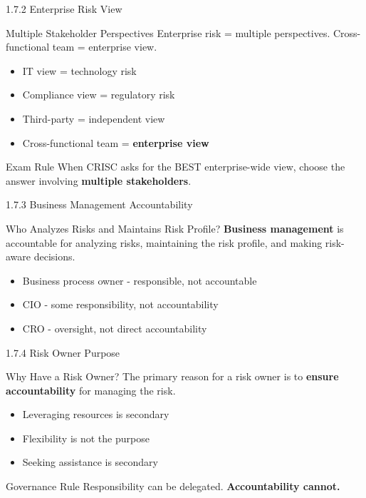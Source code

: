 \documentclass{beamer}
\begin{document}
	\begin{frame}{1.7.2 Enterprise Risk View}
		\begin{block}{Multiple Stakeholder Perspectives}
			Enterprise risk = multiple perspectives. Cross-functional team = enterprise view.
		\end{block}
		\begin{itemize}
			\item IT view = technology risk
			\item Compliance view = regulatory risk
			\item Third-party = independent view
			\item Cross-functional team = \textbf{enterprise view}
		\end{itemize}
		\begin{exampleblock}{Exam Rule}
			When CRISC asks for the BEST enterprise-wide view, choose the answer involving \textbf{multiple stakeholders}.
		\end{exampleblock}
	\end{frame}
	
	\begin{frame}{1.7.3 Business Management Accountability}
		\begin{block}{Who Analyzes Risks and Maintains Risk Profile?}
			\textbf{Business management} is accountable for analyzing risks, maintaining the risk profile, and making risk-aware decisions.
		\end{block}
		\begin{itemize}
			\item Business process owner - responsible, not accountable
			\item CIO - some responsibility, not accountability
			\item CRO - oversight, not direct accountability
		\end{itemize}
	\end{frame}
	
	\begin{frame}{1.7.4 Risk Owner Purpose}
		\begin{block}{Why Have a Risk Owner?}
			The primary reason for a risk owner is to \textbf{ensure accountability} for managing the risk.
		\end{block}
		\begin{itemize}
			\item Leveraging resources is secondary
			\item Flexibility is not the purpose
			\item Seeking assistance is secondary
		\end{itemize}
		\begin{alertblock}{Governance Rule}
			Responsibility can be delegated. \textbf{Accountability cannot.}
		\end{alertblock}
	\end{frame}
	
\end{document}
